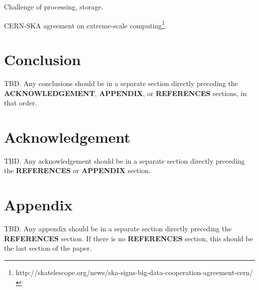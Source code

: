 \documentclass[a4paper,
               biblatex,       %
               keeplastbox,    %
               ]{jacow-2_1}    %
\newcommand\SEC[1]{\textbf{\uppercase{#1}}}
\begin{document}
Challenge of processing, storage.

CERN-SKA agreement on extreme-scale computing\footnote{http://skatelescope.org/news/ska-signs-big-data-cooperation-agreement-cern/}.


\section{Conclusion} %
\label{sec:conclusion}
TBD. Any conclusions should be in a separate section directly preceding
the \SEC{Acknowledgement}, \SEC{Appendix}, or \SEC{References} sections, in that
order.


\section{Acknowledgement} %
\label{sec:acknowledgement}
TBD. Any acknowledgement should be in a separate section directly preceding
the \SEC{References} or \SEC{Appendix} section.


\section{Appendix} %
\label{sec:appendix}
TBD. Any appendix should be in a separate section directly preceding
the \SEC{References} section. If there is no \SEC{References} section,
this should be the last section of the paper.



\label{sec:references}
\printbibliography

\end{document}
